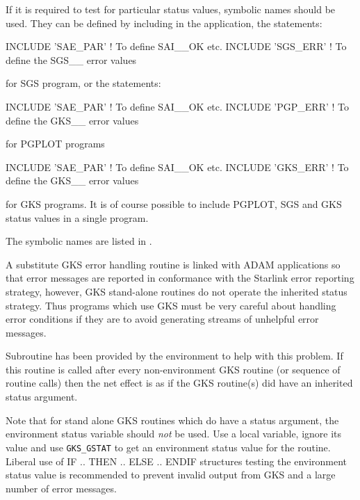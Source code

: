 \documentclass[twoside,11pt,nolof]{starlink}
\begin{document}
If it is required to test for particular status values, symbolic names should
be used. They can be defined by including in the application, the statements:

\begin{terminalv}
INCLUDE 'SAE_PAR'   ! To define SAI__OK etc.
INCLUDE 'SGS_ERR'   ! To define the SGS__ error values
\end{terminalv}

for SGS program, or the statements:

\begin{terminalv}
INCLUDE 'SAE_PAR'   ! To define SAI__OK etc.
INCLUDE 'PGP_ERR'   ! To define the GKS__ error values
\end{terminalv}

for PGPLOT programs

\begin{terminalv}
INCLUDE 'SAE_PAR'   ! To define SAI__OK etc.
INCLUDE 'GKS_ERR'   ! To define the GKS__ error values
\end{terminalv}

for GKS programs. It is of course possible to include PGPLOT, SGS and GKS
status values in a single program.

The symbolic names are listed in .

A substitute GKS error handling routine is linked with ADAM applications so
that error messages are reported in conformance with the Starlink error
reporting strategy, however, GKS stand-alone routines do not operate the
inherited status strategy. Thus programs which use GKS must be very careful
about handling error conditions if they are to avoid generating streams
of unhelpful error messages.

Subroutine 
 has been provided by the environment to help with this problem.
If this routine is called after every non-environment GKS routine
(or sequence of routine calls) then the
net effect is as if the GKS routine(s) did have an inherited status argument.

Note that for stand alone GKS routines which do have a status argument, the
environment status variable should \emph{not} be used. Use a local variable,
ignore its value and use \texttt{GKS\_GSTAT} to get an environment status value
for the
routine. Liberal use of IF .. THEN .. ELSE .. ENDIF structures testing the
environment status value is recommended to prevent invalid output from GKS and
a large number of error messages.
\end{document}
